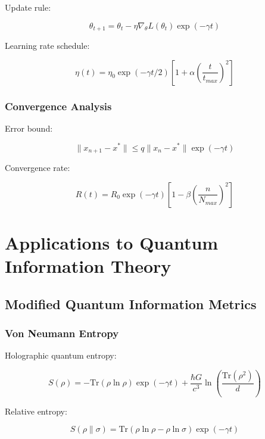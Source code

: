 \documentclass[12pt]{article}
\theoremstyle{plain}
\theoremstyle{definition}
\theoremstyle{remark}
\begin{document}
Update rule:

\begin{equation}
\theta_{t+1} = \theta_t - \eta\nabla_\theta L(\theta_t)\exp(-\gamma t)
\end{equation}

Learning rate schedule:

\begin{equation}
\eta(t) = \eta_0\exp(-\gamma t/2)\left[1 + \alpha\left(\frac{t}{t_{max}}\right)^2\right]
\end{equation}

\subsubsection{Convergence Analysis}

Error bound:

\begin{equation}
\|x_{n+1} - x^*\| \leq q\|x_n - x^*\|\exp(-\gamma t)
\end{equation}

Convergence rate:

\begin{equation}
R(t) = R_0\exp(-\gamma t)\left[1 - \beta\left(\frac{n}{N_{max}}\right)^2\right]
\end{equation}
\section{Applications to Quantum Information Theory}

\subsection{Modified Quantum Information Metrics}

\subsubsection{Von Neumann Entropy}

Holographic quantum entropy:

\begin{equation}
S(\rho) = -\text{Tr}(\rho\ln\rho)\exp(-\gamma t) + \frac{\hbar G}{c^3}\ln\left(\frac{\text{Tr}(\rho^2)}{d}\right)
\end{equation}

Relative entropy:

\begin{equation}
S(\rho\|\sigma) = \text{Tr}(\rho\ln\rho - \rho\ln\sigma)\exp(-\gamma t)
\end{equation}
\end{document}
